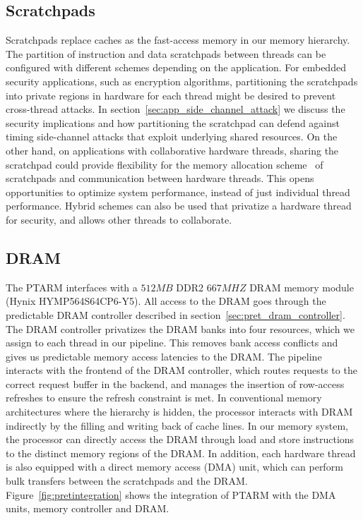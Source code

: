 \subsection{Scratchpads}
Scratchpads replace caches as the fast-access memory in our memory hierarchy.   
The partition of instruction and data scratchpads between threads can be configured with different schemes depending on the application.   
For embedded security applications, such as encryption algorithms, partitioning the scratchpads into private regions in hardware for each thread might be desired to prevent cross-thread attacks.
In section~\ref{sec:app_side_channel_attack} we discuss the security implications and how partitioning the scratchpad can defend against timing side-channel attacks that exploit underlying shared resources.
On the other hand, on applications with collaborative hardware threads, sharing the scratchpad could provide flexibility for the memory allocation scheme~\cite{Suhendra:2010:SAC:1734206.1734210} of scratchpads and communication between hardware threads.
This opens opportunities to optimize system performance, instead of just individual thread performance.  
Hybrid schemes can also be used that privatize a hardware thread for security, and allows other threads to collaborate.  

\subsection{DRAM}
\label{sec:ptarm_dram_integration}
The PTARM interfaces with a $512MB$ DDR2 $667MHZ$ DRAM memory module (Hynix HYMP564S64CP6-Y5). 
All access to the DRAM goes through the predictable DRAM controller described in section~\ref{sec:pret_dram_controller}.
The DRAM controller privatizes the DRAM banks into four resources, which we assign to each thread in our pipeline. 
This removes bank access conflicts and gives us predictable memory access latencies to the DRAM.
The pipeline interacts with the frontend of the DRAM controller, which routes requests to the correct request buffer in the backend, and manages the insertion of row-access refreshes to ensure the refresh constraint is met.   
In conventional memory architectures where the hierarchy is hidden, the processor interacts with DRAM indirectly by the filling and writing back of cache lines.
In our memory system, the processor can directly access the DRAM through load and store instructions to the distinct memory regions of the DRAM.
In addition, each hardware thread is also equipped with a direct memory access (DMA) unit, which can perform bulk transfers between the scratchpads and the DRAM.
Figure~\ref{fig:pretintegration} shows the integration of PTARM with the DMA units, memory controller and DRAM.  

